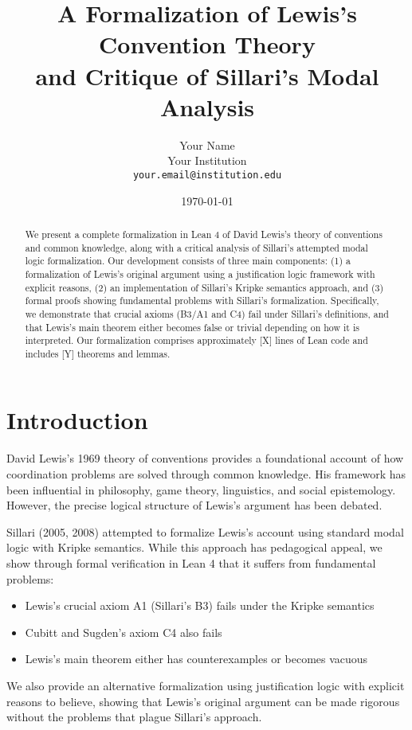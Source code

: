 \documentclass[11pt]{article}
\title{A Formalization of Lewis's Convention Theory\\ and Critique of Sillari's Modal Analysis}
\author{Your Name\\
Your Institution\\
\texttt{your.email@institution.edu}}
\date{\today}
\begin{document}
\maketitle

\begin{abstract}
We present a complete formalization in Lean 4 of David Lewis's theory of conventions 
and common knowledge, along with a critical analysis of Sillari's attempted modal 
logic formalization. Our development consists of three main components: (1) a 
formalization of Lewis's original argument using a justification logic framework 
with explicit reasons, (2) an implementation of Sillari's Kripke semantics approach, 
and (3) formal proofs showing fundamental problems with Sillari's formalization. 
Specifically, we demonstrate that crucial axioms (B3/A1 and C4) fail under Sillari's 
definitions, and that Lewis's main theorem either becomes false or trivial depending 
on how it is interpreted. Our formalization comprises approximately [X] lines of 
Lean code and includes [Y] theorems and lemmas.
\end{abstract}

\section{Introduction}

David Lewis's 1969 theory of conventions provides a foundational account of how 
coordination problems are solved through common knowledge. His framework has been 
influential in philosophy, game theory, linguistics, and social epistemology. 
However, the precise logical structure of Lewis's argument has been debated.

Sillari (2005, 2008) attempted to formalize Lewis's account using standard modal 
logic with Kripke semantics. While this approach has pedagogical appeal, we show 
through formal verification in Lean 4 that it suffers from fundamental problems:

\begin{itemize}
\item Lewis's crucial axiom A1 (Sillari's B3) fails under the Kripke semantics
\item Cubitt and Sugden's axiom C4 also fails
\item Lewis's main theorem either has counterexamples or becomes vacuous
\end{itemize}

We also provide an alternative formalization using justification logic with explicit 
reasons to believe, showing that Lewis's original argument can be made rigorous 
without the problems that plague Sillari's approach.
\end{document}
